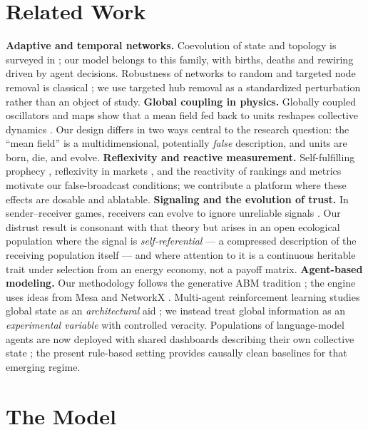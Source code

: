 \documentclass[10pt]{article}
\begin{document}
\section{Related Work}
\textbf{Adaptive and temporal networks.} Coevolution of state and topology is
surveyed in \cite{gross2008adaptive,holme2012temporal}; our model belongs to
this family, with births, deaths and rewiring driven by agent decisions.
Robustness of networks to random and targeted node removal is classical
\cite{albert2000error}; we use targeted hub removal as a standardized
perturbation rather than an object of study.
\textbf{Global coupling in physics.} Globally coupled oscillators and maps
show that a mean field fed back to units reshapes collective dynamics
\cite{kuramoto1984chemical}. Our design differs in two ways central to the
research question: the ``mean field'' is a multidimensional, potentially
\emph{false} description, and units are born, die, and evolve.
\textbf{Reflexivity and reactive measurement.} Self-fulfilling prophecy
\cite{merton1948self}, reflexivity in markets \cite{soros2013fallibility}, and
the reactivity of rankings and metrics
\cite{espeland2007rankings,strathern1997improving} motivate our false-broadcast
conditions; we contribute a platform where these effects are dosable and
ablatable.
\textbf{Signaling and the evolution of trust.} In sender--receiver games,
receivers can evolve to ignore unreliable signals \cite{skyrms2010signals}.
Our distrust result is consonant with that theory but arises in an open
ecological population where the signal is \emph{self-referential} ---
a compressed description of the receiving population itself --- and where
attention to it is a continuous heritable trait under selection from an
energy economy, not a payoff matrix.
\textbf{Agent-based modeling.} Our methodology follows the generative ABM
tradition \cite{epstein1996growing,bonabeau2002agent}; the engine uses ideas
from Mesa \cite{kazil2020mesa} and NetworkX \cite{hagberg2008exploring}.
Multi-agent reinforcement learning studies global state as an
\emph{architectural} aid \cite{foerster2016learning}; we instead treat global
information as an \emph{experimental variable} with controlled veracity.
Populations of language-model agents are now deployed with shared dashboards
describing their own collective state \cite{park2023generative}; the present
rule-based setting provides causally clean baselines for that emerging regime.

\section{The Model}
\end{document}
